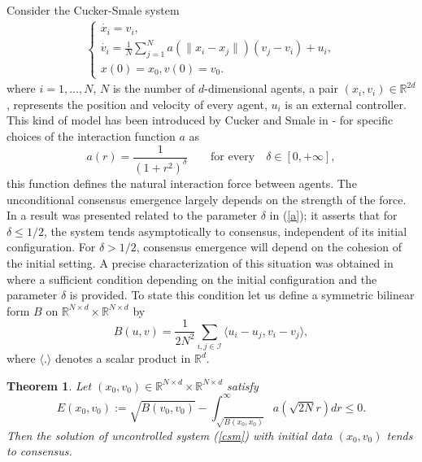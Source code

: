 \documentclass[a4paper,10pt, english]{article}
\newcommand{\D}{\displaystyle}
\newtheorem{theo}{Theorem}[section]
\begin{document}
Consider the Cucker-Smale system
\begin{align}
\begin{cases}
\D
\dot{x_i} = v_i,\\
\dot{v_i} = \frac{1}{N}\sum_{j=1}^{N}a(\|x_i - x_j\|)(v_j - v_i) + u_i, \\
x(0) = x_0,
v(0) = v_0.
\end{cases}
\label{csm}
\end{align}
where $i =1, \dots, N$, $N$ is the number of  $d$-dimensional agents, a pair $(x_i, v_i)\in \mathbb{R}^{2d}$, represents the position and velocity of every agent, $u_i$ is an external controller. This kind of model has been introduced by Cucker and Smale in \cite{cs1} - \cite{cs2} for specific choices of the interaction function $a$ as
\begin{equation}
a(r) = \frac{1}{(1 + r^2)^\delta} \qquad \mbox{for every}\quad \delta \in [0, +\infty],
\label{a}
\end{equation}
this function defines the natural interaction force between agents. The unconditional consensus emergence largely depends on the strength of the force. In \cite{cs2} a result was presented related to the parameter $\delta$ in (\ref{a}); it asserts that for $\delta \leq 1/2$, the system tends asymptotically to consensus, independent of its initial configuration. For $\delta > 1/2$, consensus emergence will depend on the cohesion of the initial setting. A precise characterization of this situation was obtained in \cite{theorem11} where a sufficient condition depending on the initial configuration and the parameter $\delta$ is provided. To state this condition let us define a symmetric bilinear form $B$ on $\mathbb{R}^{N\times d} \times  \mathbb{R}^{N\times d}$ by
\begin{equation}
B(u, v) = \frac{1}{2N^2}\sum_{i, j \in \mathcal{I}} \langle u_i - u_j, v_i - v_j  \rangle,
\label{b}
\end{equation}
where $\langle . \rangle$ denotes a scalar product in $\mathbb{R}^d$.
\begin{theo}
Let $(x_0, v_0) \in \mathbb{R}^{N\times d} \times  \mathbb{R}^{N\times d}$ satisfy
\begin{equation}
E(x_0, v_0):=\sqrt{B(v_0, v_0)} - \int_{\sqrt{B(x_0, x_0)}}^{\infty} a(\sqrt{2N}r)dr \leq 0.
\label{cq}
\end{equation}
Then the solution of uncontrolled system (\ref{csm}) with initial data $(x_0, v_0)$  tends to consensus.
\end{theo}
\end{document}
